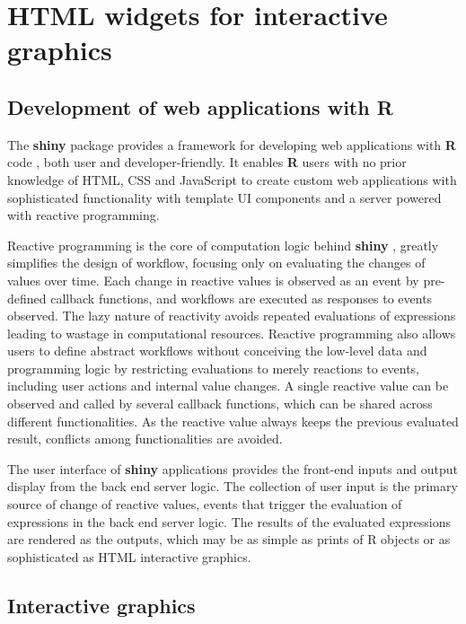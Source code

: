 \documentclass{aucklandthesis}
\begin{document}
\hypertarget{html-widgets-for-interactive-graphics}{%
\section{HTML widgets for interactive graphics}\label{html-widgets-for-interactive-graphics}}

\hypertarget{sec:shiny}{%
\subsection{Development of web applications with R}\label{sec:shiny}}

The \textbf{shiny} package \autocite{shiny} provides a framework for developing web applications with \textbf{R} code \autocite{R2021}, both user and developer-friendly. It enables \textbf{R} users with no prior knowledge of HTML, CSS and JavaScript to create custom web applications with sophisticated functionality with template UI components and a server powered with reactive programming.

Reactive programming is the core of computation logic behind \textbf{shiny} \autocite{mshiny}, greatly simplifies the design of workflow, focusing only on evaluating the changes of values over time. Each change in reactive values is observed as an event by pre-defined callback functions, and workflows are executed as responses to events observed. The lazy nature of reactivity avoids repeated evaluations of expressions leading to wastage in computational resources. Reactive programming also allows users to define abstract workflows without conceiving the low-level data and programming logic by restricting evaluations to merely reactions to events, including user actions and internal value changes. A single reactive value can be observed and called by several callback functions, which can be shared across different functionalities. As the reactive value always keeps the previous evaluated result, conflicts among functionalities are avoided.

The user interface of \textbf{shiny} applications provides the front-end inputs and output display from the back end server logic. The collection of user input is the primary source of change of reactive values, events that trigger the evaluation of expressions in the back end server logic. The results of the evaluated expressions are rendered as the outputs, which may be as simple as prints of R objects or as sophisticated as HTML interactive graphics.

\hypertarget{sec:int-graphics}{%
\subsection{Interactive graphics}\label{sec:int-graphics}}
\end{document}
